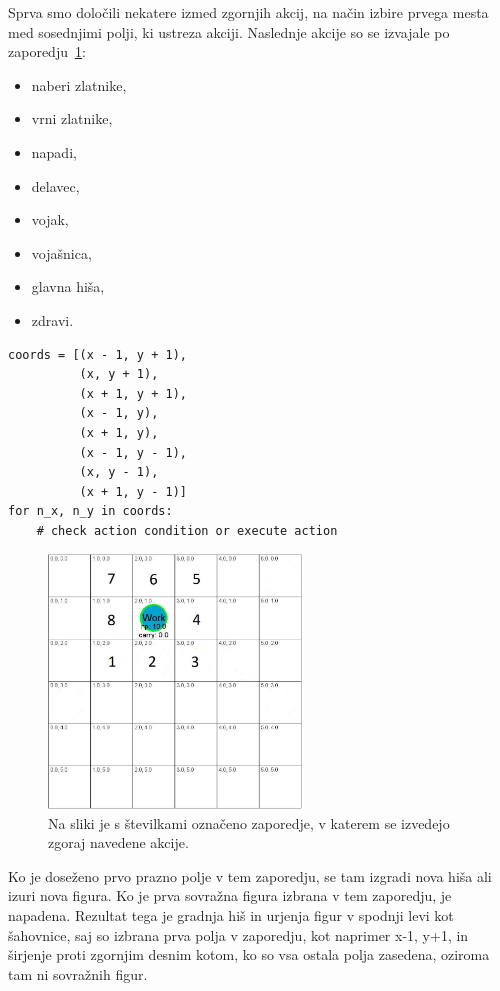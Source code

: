 \documentclass[a4paper, 12pt]{book}
\begin{document}
Sprva smo določili nekatere izmed zgornjih akcij, na način izbire prvega mesta med sosednjimi polji, ki ustreza akciji. 
Naslednje akcije so se izvajale po zaporedju~\ref{pickorakiPreverjanja}:
\begin{itemize}
	\item naberi zlatnike,
	\item vrni zlatnike,
	\item napadi,
	\item delavec,
	\item vojak, 
	\item vojašnica,
	\item glavna hiša,
	\item zdravi.
\end{itemize}
\begin{verbatim}
coords = [(x - 1, y + 1),
          (x, y + 1),
          (x + 1, y + 1),
          (x - 1, y),
          (x + 1, y),
          (x - 1, y - 1),
          (x, y - 1),
          (x + 1, y - 1)]
for n_x, n_y in coords:
    # check action condition or execute action
\end{verbatim}

\begin{figure}[h]
	\begin{center}
		\includegraphics[width=0.6\textwidth]{photos/korakiPreverjanja.pdf}
	\end{center}
	\caption{Na sliki je s številkami označeno zaporedje, v katerem se izvedejo zgoraj navedene akcije.}
	\label{pickorakiPreverjanja}
\end{figure}



Ko je doseženo prvo prazno polje v tem zaporedju, se tam izgradi nova hiša ali izuri nova figura.
Ko je prva sovražna figura izbrana v tem zaporedju, je napadena.
Rezultat tega je gradnja hiš in urjenja figur v spodnji levi kot šahovnice, saj so izbrana prva polja v zaporedju, kot naprimer x-1, y+1, in širjenje proti zgornjim desnim kotom, ko so vsa ostala polja zasedena, oziroma tam ni sovražnih figur.
\end{document}
